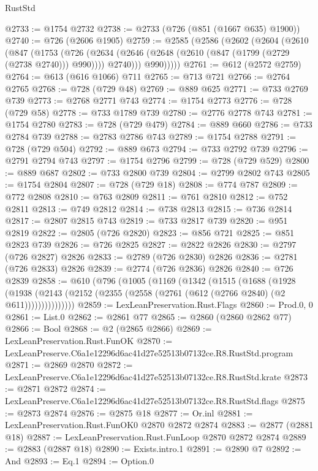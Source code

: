 \begin{lexlean}{RustStd}
\begin{coremodule}
@2733 := @1754 @2732
@2738 := @2733 (@726 (@851 (@1667 @635) @1900))
@2740 := @726 (@2606 @1905)
@2759 := @2585
    (@2586
      (@2602
        (@2604
          (@2610
            (@847
              (@1753
                (@726
                  (@2634 (@2646 (@2648 (@2610 (@847 (@1799 (@2729 (@2738 @2740))) @990)))) @2740)))
              @990)))))
@2761 := @612 (@2572 @2759)
@2764 := @613 (@616 @1066) @711
@2765 := @713 @721
@2766 := @2764 @2765
@2768 := @728 (@729 @48)
@2769 := @889 @625
@2771 := @733 @2769 @739
@2773 := @2768 @2771 @743
@2774 := @1754 @2773
@2776 := @728 (@729 @58)
@2778 := @733 @1789 @739
@2780 := @2776 @2778 @743
@2781 := @1754 @2780
@2783 := @728 (@729 @479)
@2784 := @889 @660
@2786 := @733 @2784 @739
@2788 := @2783 @2786 @743
@2789 := @1754 @2788
@2791 := @728 (@729 @504)
@2792 := @889 @673
@2794 := @733 @2792 @739
@2796 := @2791 @2794 @743
@2797 := @1754 @2796
@2799 := @728 (@729 @529)
@2800 := @889 @687
@2802 := @733 @2800 @739
@2804 := @2799 @2802 @743
@2805 := @1754 @2804
@2807 := @728 (@729 @18)
@2808 := @774 @787
@2809 := @772 @2808
@2810 := @763 @2809
@2811 := @761 @2810
@2812 := @752 @2811
@2813 := @749 @2812
@2814 := @738 @2813
@2815 := @736 @2814
@2817 := @2807 @2815 @743
@2819 := @733 @2817 @739
@2820 := @951 @2819
@2822 := @2805 (@726 @2820)
@2823 := @856 @721
@2825 := @851 @2823 @739
@2826 := @726 @2825
@2827 := @2822 @2826
@2830 := @2797 (@726 @2827) @2826
@2833 := @2789 (@726 @2830) @2826
@2836 := @2781 (@726 @2833) @2826
@2839 := @2774 (@726 @2836) @2826
@2840 := @726 @2839
@2858 := @610
    (@796
      (@1005
        (@1169
          (@1342
            (@1515
              (@1688
                (@1928
                  (@1938
                    (@2143 (@2152 (@2355 (@2558 (@2761 (@612 (@2766 @2840) (@2 @611)))))))))))))))
@2859 := LexLeanPreservation.Rust.Flags
@2860 := Prod.{0, 0}
@2861 := List.{0}
@2862 := @2861 @77
@2865 := @2860 (@2860 @2862 @77)
@2866 := Bool
@2868 := @2 (@2865 @2866)
@2869 := LexLeanPreservation.Rust.FunOK
@2870 := LexLeanPreserve.C6a1e12296d6ac41d27e52513b07132ce.R8.RustStd.program
@2871 := @2869 @2870
@2872 := LexLeanPreserve.C6a1e12296d6ac41d27e52513b07132ce.R8.RustStd.krate
@2873 := @2871 @2872
@2874 := LexLeanPreserve.C6a1e12296d6ac41d27e52513b07132ce.R8.RustStd.flags
@2875 := @2873 @2874
@2876 := @2875 @18
@2877 := Or.inl
@2881 := LexLeanPreservation.Rust.FunOK0 @2870 @2872 @2874
@2883 := @2877 (@2881 @18)
@2887 := LexLeanPreservation.Rust.FunLoop @2870 @2872 @2874
@2889 := @2883 (@2887 @18)
@2890 := Exists.intro.{1}
@2891 := @2890 @7
@2892 := And
@2893 := Eq.{1}
@2894 := Option.{0}

\end{coremodule}
\end{lexlean}
